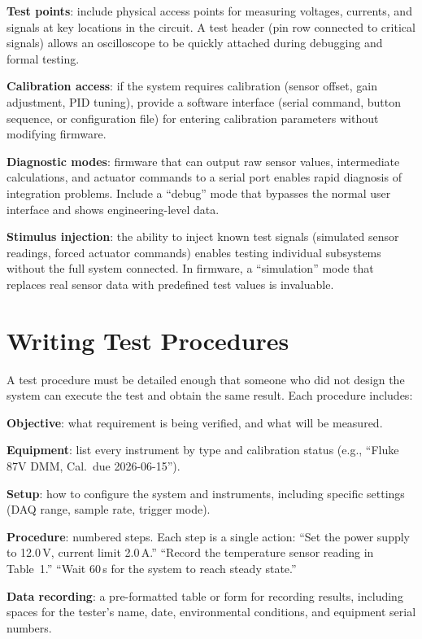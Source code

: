 \documentclass[11pt,letterpaper,twoside,openany]{book}
\begin{document}
\textbf{Test points}: include physical access points for measuring voltages, currents, and signals at key locations in the circuit. A test header (pin row connected to critical signals) allows an oscilloscope to be quickly attached during debugging and formal testing.

\textbf{Calibration access}: if the system requires calibration (sensor offset, gain adjustment, PID tuning), provide a software interface (serial command, button sequence, or configuration file) for entering calibration parameters without modifying firmware.

\textbf{Diagnostic modes}: firmware that can output raw sensor values, intermediate calculations, and actuator commands to a serial port enables rapid diagnosis of integration problems. Include a ``debug'' mode that bypasses the normal user interface and shows engineering-level data.

\textbf{Stimulus injection}: the ability to inject known test signals (simulated sensor readings, forced actuator commands) enables testing individual subsystems without the full system connected. In firmware, a ``simulation'' mode that replaces real sensor data with predefined test values is invaluable.

\section{Writing Test Procedures}
A test procedure must be detailed enough that someone who did not design the system can execute the test and obtain the same result. Each procedure includes:

\textbf{Objective}: what requirement is being verified, and what will be measured.

\textbf{Equipment}: list every instrument by type and calibration status (e.g., ``Fluke 87V DMM, Cal.\ due 2026-06-15'').

\textbf{Setup}: how to configure the system and instruments, including specific settings (DAQ range, sample rate, trigger mode).

\textbf{Procedure}: numbered steps. Each step is a single action: ``Set the power supply to 12.0\,V, current limit 2.0\,A.'' ``Record the temperature sensor reading in Table~1.'' ``Wait 60\,s for the system to reach steady state.''

\textbf{Data recording}: a pre-formatted table or form for recording results, including spaces for the tester's name, date, environmental conditions, and equipment serial numbers.
\end{document}
